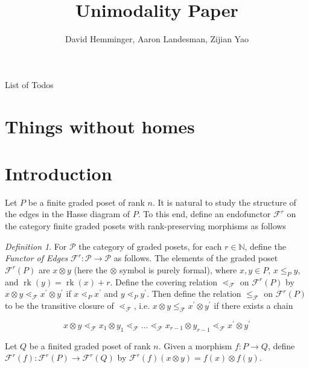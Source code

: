 \documentclass{amsart}
\title{Unimodality Paper}
\author{David Hemminger, Aaron Landesman, Zijian Yao}
\makeatletter
\theoremstyle{remark}
\newtheorem{defn}[thm]{Definition}
\newcommand\BN{{\mathbb N}}
\newcommand\rk{\operatorname{rk}}
\def\listtodoname{List of Todos}
\def\listoftodos{\@starttoc{tdo}\listtodoname}
\makeatother
\begin{document}
\listoftodos

\maketitle

\section{Things without homes}





\section{Introduction}\label{sec:introduction}
Let $P$ be a finite graded poset of rank $n$.  It is natural to study the structure of the edges in the Hasse diagram of $P$.  To this end, define an endofunctor $\mathcal{F}^r$ on the category finite graded posets with rank-preserving morphisms as follows

\begin{defn}
\label{defn:functor_of_edges}
For $\mathcal P$ the category of graded posets, for each $r \in \BN$, define the {\it Functor of Edges} $\mathcal F^r:\mathcal P \rightarrow \mathcal P$ as follows. The elements of the graded poset $\mathcal{F}^r(P)$ are $x\otimes y$ (here the $\otimes$ symbol is purely formal), where $x,y\in P$, $x\le_P y$, and $\rk(y) = \rk(x) + r$. Define the covering relation $\lessdot_{\mathcal{F}}$ on $\mathcal{F}^r(P)$ by $x\otimes y \lessdot_{\mathcal{F}} x^\prime\otimes y^\prime$ if $x\lessdot_P x^\prime$ and $y\lessdot_P y^\prime$.  Then define the relation $\le_{\mathcal{F}}$ on $\mathcal{F}^r(P)$ to be the transitive closure of $\lessdot_{\mathcal{F}}$, i.e. $x\otimes y \le_{\mathcal{F}} x^\prime\otimes y^\prime$  if there exists a chain

$$x\otimes y\lessdot_{\mathcal{F}} x_1\otimes y_1\lessdot_{\mathcal{F}}\ldots\lessdot_{\mathcal{F}} x_{r-1}\otimes y_{r-1}\lessdot_{\mathcal{F}} x^\prime\otimes y^\prime$$


Let $Q$ be a finited graded poset of rank $n$.  Given a morphism $f\colon P\rightarrow Q$, define $\mathcal{F}^r(f)\colon \mathcal{F}^r(P)\rightarrow \mathcal{F}^r(Q)$ by $\mathcal{F}^r(f)(x\otimes y) = f(x)\otimes f(y)$.
\end{defn}
\end{document}

